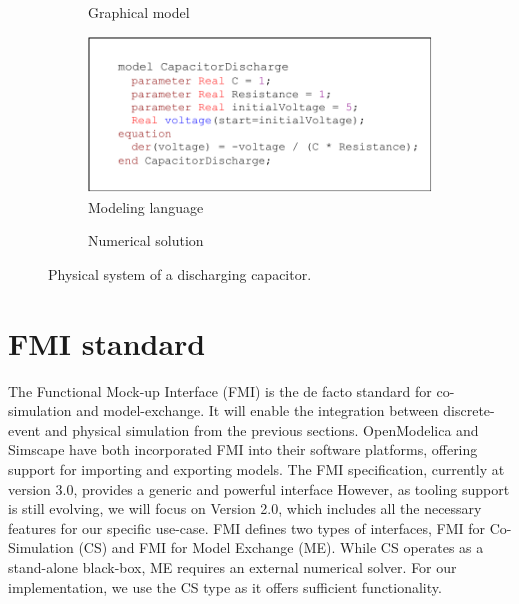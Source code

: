 \documentclass[conference]{IEEEtran}
\begin{document}
\begin{figure}[htbp]
  \centering
  \begin{subfigure}[b]{\linewidth}
    \centering
    
    \caption{Graphical model}
    \label{cd:graphical-model}
  \end{subfigure}
  
  \vspace{1em}
  
  \begin{subfigure}[b]{\linewidth}
    \centering
    \includegraphics[width=0.9\linewidth]{images/capacitor-discharge-code.drawio.pdf}
    \caption{Modeling language}
    \label{cd:modeling-language}
  \end{subfigure}
  
  \vspace{1em}
  
  \begin{subfigure}[b]{\linewidth}
    \centering
    
    \caption{Numerical solution}
    \label{cd:numerical-solution}
  \end{subfigure}
  
  \caption{Physical system of a discharging capacitor.}
  \label{capacitor-discharge}
\end{figure}

\section{FMI standard}

The Functional Mock-up Interface (FMI) is the de facto standard for co-simulation and model-exchange.
It will enable the integration between discrete-event and physical simulation from the previous sections.
OpenModelica and Simscape have both incorporated FMI into their software platforms, offering support for importing and exporting models.
The FMI specification, currently at version 3.0, provides a generic and powerful interface
However, as tooling support is still evolving, we will focus on Version 2.0, which includes all the necessary features for our specific use-case.
FMI defines two types of interfaces, FMI for Co-Simulation (CS) and FMI for Model Exchange (ME).
While CS operates as a stand-alone black-box, ME requires an external numerical solver.
For our implementation, we use the CS type as it offers sufficient functionality.
\end{document}
